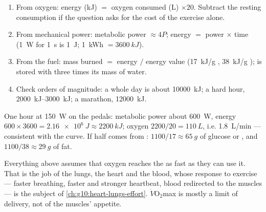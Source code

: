 \begin{method}\label{met:g10:exercise-and-energy:calc}
\begin{enumerate}
  \item From oxygen: energy (\unit{kJ}) $=$ oxygen consumed (\unit{L})
        $\times 20$. Subtract the resting consumption if the question
        asks for the cost of the exercise alone.
  \item From mechanical power: metabolic power $\approx 4 P$; energy
        $=$ power $\times$ time (\qty{1}{W} for \qty{1}{s} is
        \qty{1}{J}; \qty{1}{kWh} $= \qty{3600}{kJ}$).
  \item From the fuel: mass burned $=$ energy $/$ energy value
        (\qty{17}{kJ/g} , \qty{38}{kJ/g} );  is
        stored with three times its mass of water.
  \item Check orders of magnitude: a whole day is about
        \qty{10000}{kJ}; a hard hour, \qtyrange{2000}{3000}{kJ}; a
        marathon, \qty{12000}{kJ}.
\end{enumerate}
\end{method}

\begin{example}\label{ex:g10:exercise-and-energy:hour}
One hour at \qty{150}{W} on the pedals: metabolic power about
\qty{600}{W}, energy $600 \times 3600 = \qty{2.16e6}{J} \approx
\qty{2200}{kJ}$; oxygen $2200/20 = \qty{110}{L}$, i.e. \qty{1.8}{L/min}
--- consistent with the curve. If half comes from :
$1100/17 \approx \qty{65}{g}$ of glucose or , and
$1100/38 \approx \qty{29}{g}$ of fat.
\end{example}

\begin{remark}\label{rem:g10:exercise-and-energy:delivery}
Everything above assumes that oxygen reaches the  as fast
as they can use it. That is the job of the lungs, the heart and the
blood, whose response to exercise --- faster breathing, faster and
stronger heartbeat, blood redirected to the muscles --- is the subject
of \cref{ch:g10:heart-lungs-effort}. $\dot V\!\mathrm{O_2}$max is
mostly a limit of delivery, not of the muscles' appetite.
\end{remark}

